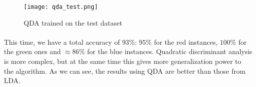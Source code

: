 \begin{figure}[h]
    \centering
    \texttt{[image: qda\_test.png]}
    \caption{QDA trained on the test dataset}
\end{figure}

\paragraph{}
This time, we have a total accuracy of $93\%$: $95\%$ for the red instances, $100\%$ for the green ones and $\approx 86\%$ for the blue instances.
Quadratic discriminant analysis is more complex, but at the same time this gives more generalization power to the algorithm.
As we can see, the results using QDA are better than those from LDA.